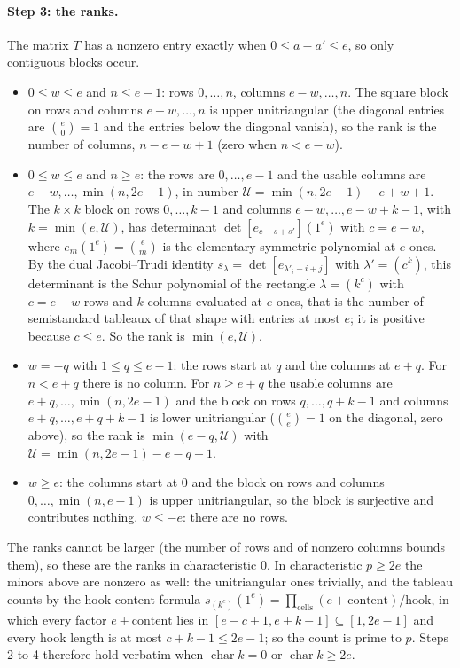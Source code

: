 \documentclass[11pt]{article}
\theoremstyle{definition}
\theoremstyle{remark}
\newcommand{\ch}{\operatorname{char}}
\begin{document}
\paragraph{Step 3: the ranks.} The matrix $T$ has a nonzero entry exactly when $0\le a-a'\le e$, so only contiguous blocks occur.
\begin{itemize}
\item $0\le w\le e$ and $n\le e-1$: rows $0,\dots,n$, columns $e-w,\dots,n$. The square block on rows and columns $e-w,\dots,n$ is upper unitriangular (the diagonal entries are $\binom e0=1$ and the entries below the diagonal vanish), so the rank is the number of columns, $n-e+w+1$ (zero when $n<e-w$).
\item $0\le w\le e$ and $n\ge e$: the rows are $0,\dots,e-1$ and the usable columns are $e-w,\dots,\min(n,2e-1)$, in number $\mathcal U=\min(n,2e-1)-e+w+1$. The $k\times k$ block on rows $0,\dots,k-1$ and columns $e-w,\dots,e-w+k-1$, with $k=\min(e,\mathcal U)$, has determinant $\det[e_{c-s+s'}](1^e)$ with $c=e-w$, where $e_m(1^e)=\binom em$ is the elementary symmetric polynomial at $e$ ones. By the dual Jacobi--Trudi identity $s_\lambda=\det[e_{\lambda'_i-i+j}]$ with $\lambda'=(c^k)$, this determinant is the Schur polynomial of the rectangle $\lambda=(k^c)$ with $c=e-w$ rows and $k$ columns evaluated at $e$ ones, that is the number of semistandard tableaux of that shape with entries at most $e$; it is positive because $c\le e$. So the rank is $\min(e,\mathcal U)$.
\item $w=-q$ with $1\le q\le e-1$: the rows start at $q$ and the columns at $e+q$. For $n<e+q$ there is no column. For $n\ge e+q$ the usable columns are $e+q,\dots,\min(n,2e-1)$ and the block on rows $q,\dots,q+k-1$ and columns $e+q,\dots,e+q+k-1$ is lower unitriangular ($\binom ee=1$ on the diagonal, zero above), so the rank is $\min(e-q,\mathcal U)$ with $\mathcal U=\min(n,2e-1)-e-q+1$.
\item $w\ge e$: the columns start at $0$ and the block on rows and columns $0,\dots,\min(n,e-1)$ is upper unitriangular, so the block is surjective and contributes nothing. $w\le-e$: there are no rows.
\end{itemize}
The ranks cannot be larger (the number of rows and of nonzero columns bounds them), so these are the ranks in characteristic $0$. In characteristic $p\ge2e$ the minors above are nonzero as well: the unitriangular ones trivially, and the tableau counts by the hook-content formula $s_{(k^c)}(1^e)=\prod_{\text{cells}}(e+\text{content})/\text{hook}$, in which every factor $e+\text{content}$ lies in $[e-c+1,e+k-1]\subseteq[1,2e-1]$ and every hook length is at most $c+k-1\le2e-1$; so the count is prime to $p$. Steps 2 to 4 therefore hold verbatim when $\ch k=0$ or $\ch k\ge2e$.
\end{document}
